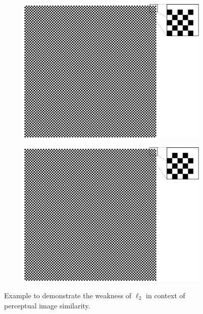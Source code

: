 \begin{figure}[htpb]
\centering
\begin{subfigure}{0.5\textwidth}
  \centering
  \includegraphics[width=.8\linewidth]{figures/chess1.pdf}
  \caption{}
  \label{fig:chess1}
\end{subfigure}%
\begin{subfigure}{0.5\textwidth}
  \centering
  \includegraphics[width=.8\linewidth]{figures/chess2.pdf}
  \caption{}
  \label{fig:chess2}
\end{subfigure}
\caption[Example of $ \ell_{2} $ Weakness]{Example to demonstrate the weakness of $ \ell_{2} $ in context of perceptual image similarity.} \label{fig:chessfield}
\end{figure}

